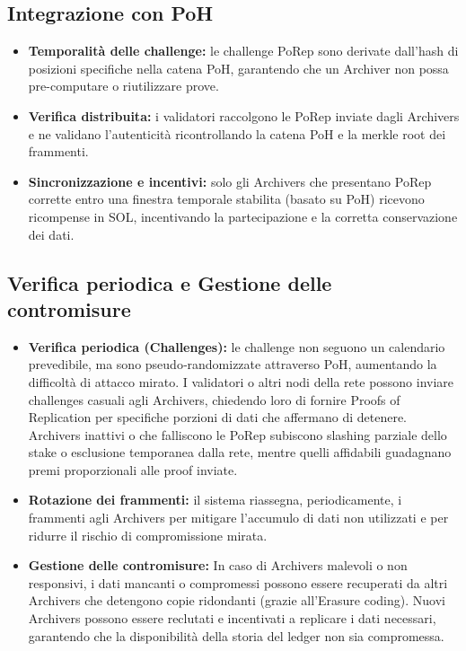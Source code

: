 \documentclass[a4paper,12pt]{report}
\begin{document}
	\subsection{Integrazione con PoH}
	\begin{itemize}
		\item \textbf{Temporalità delle challenge:} le challenge PoRep sono derivate dall’hash di posizioni specifiche nella catena PoH, garantendo che un Archiver non possa pre-computare o riutilizzare prove.
		\item \textbf{Verifica distribuita:} i validatori raccolgono le PoRep inviate dagli Archivers e ne validano l’autenticità ricontrollando la catena PoH e la merkle root dei frammenti.
		\item \textbf{Sincronizzazione e incentivi:} solo gli Archivers che presentano PoRep corrette entro una finestra temporale stabilita (basato su PoH) ricevono ricompense in SOL, incentivando la partecipazione e la corretta conservazione dei dati.
	\end{itemize}
	
	\subsection{Verifica periodica e Gestione delle contromisure}
	\begin{itemize}
		\item \textbf{Verifica periodica (Challenges):} le challenge non seguono un calendario prevedibile, ma sono pseudo‑randomizzate attraverso PoH, aumentando la difficoltà di attacco mirato. I validatori o altri nodi della rete possono inviare challenges casuali agli Archivers, chiedendo loro di fornire Proofs of Replication per specifiche porzioni di dati che affermano di detenere. Archivers inattivi o che falliscono le PoRep subiscono slashing parziale dello stake o esclusione temporanea dalla rete, mentre quelli affidabili guadagnano premi proporzionali alle proof inviate.
		\item \textbf{Rotazione dei frammenti:} il sistema riassegna, periodicamente, i frammenti agli Archivers per mitigare l’accumulo di dati non utilizzati e per ridurre il rischio di compromissione mirata.
		\item \textbf{Gestione delle contromisure:} In caso di Archivers malevoli o non responsivi, i dati mancanti o compromessi possono essere recuperati da altri Archivers che detengono copie ridondanti (grazie all'Erasure coding). Nuovi Archivers possono essere reclutati e incentivati a replicare i dati necessari, garantendo che la disponibilità della storia del ledger non sia compromessa.
	\end{itemize}
	
\end{document}

